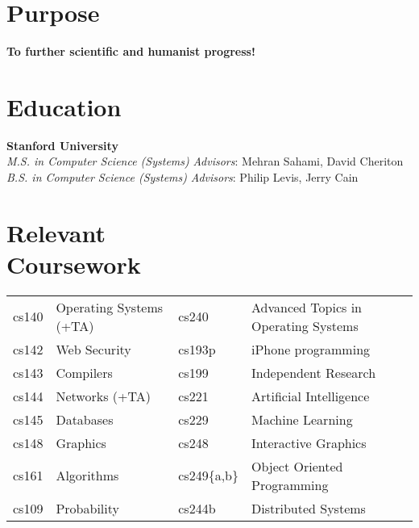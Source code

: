 \documentclass[margin,line]{resume}
\begin{document}
\begin{resume}


    \section{\mysidestyle Purpose}
    \textbf{To further scientific and humanist progress!}


    \section{\mysidestyle Education}

    \textbf{Stanford University} \vspace{2mm}\\\vspace{1mm}%
    \textsl{M.S. in Computer Science (Systems)}  \hfill \emph{Advisors}: Mehran Sahami, David Cheriton\\
    \textsl{B.S. in Computer Science (Systems)}  \hfill \emph{Advisors}: Philip Levis, Jerry Cain

    \section{\mysidestyle Relevant \\ Coursework}
    \begin{tabular}{llll}
cs140  & Operating Systems (+TA) \hspace{0.15\textwidth}
                             &  cs240  & Advanced Topics in Operating Systems \\
cs142  & Web Security        &  cs193p & iPhone programming     \\
cs143  & Compilers           &  cs199  & Independent Research    \\
cs144  & Networks (+TA)      &  cs221  & Artificial Intelligence \\
cs145  & Databases           &  cs229  & Machine Learning        \\
cs148  & Graphics            &  cs248  & Interactive Graphics  \\
cs161  & Algorithms          &  cs249\{a,b\} & Object Oriented Programming \\
cs109  & Probability         &  cs244b & Distributed Systems    \\
    \end{tabular}



\end{resume}
\end{document}
